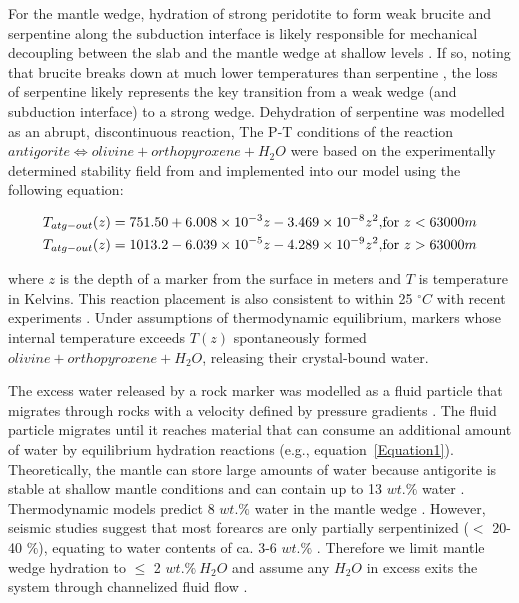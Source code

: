 \documentclass[draft]{agujournal2019}
\begin{document}
For the mantle wedge, hydration of strong peridotite to form weak brucite and serpentine along the subduction interface is likely responsible for mechanical decoupling between the slab and the mantle wedge at shallow levels \cite{Peacock1999a, Hyndman2003}. If so, noting that brucite breaks down at much lower temperatures than serpentine \cite{Schmidt1998}, the loss of serpentine likely represents the key transition from a weak wedge (and subduction interface) to a strong wedge. Dehydration of serpentine was modelled as an abrupt, discontinuous reaction,  The P-T conditions of the reaction $antigorite \Leftrightarrow olivine + orthopyroxene + H_{2}O$ were based on the experimentally determined stability field from  and implemented into our model using the following equation:

\begin{equation}
 \begin{alignedat}{2}
  T_{atg-out}(z) &= 751.50+\num{6.008d-3}z-\num{3.469d-8}z^2, && \text{for $z<63000m$} \\
  T_{atg-out}(z) &= 1013.2-\num{6.039d-5}z-\num{4.289d-9}z^2, && \text{for $z>63000m$}
 \end{alignedat}
 \label{Equation1}
\end{equation}

where $z$ is the depth of a marker from the surface in meters and $T$ is temperature in Kelvins. This reaction placement is also consistent to within 25 $^{\circ}C$ with recent experiments \cite{Shen2015}. Under assumptions of thermodynamic equilibrium, markers whose internal temperature exceeds $T(z)$  spontaneously formed $olivine \allowbreak+ orthopyroxene \allowbreak+ H_2O$, releasing their crystal-bound water. 

The excess water released by a rock marker was modelled as a fluid particle that migrates through rocks with a velocity defined by pressure gradients  \cite[see Appendix A]{Faccenda2009}. The fluid particle migrates until it reaches material that can consume an additional amount of water by equilibrium  hydration reactions (e.g., equation~\ref{Equation1}). Theoretically, the mantle can store large amounts of water because antigorite is stable at shallow mantle conditions and can contain up to 13 $wt.\%$ water \cite{Reynard2013}. Thermodynamic models predict 8 $wt.\%$ water in the mantle wedge \cite{Connolly2005}. However, seismic studies suggest that most forearcs are only partially serpentinized ($<$ 20-40 $\%$), equating to water contents of ca. 3-6 $wt.\%$ \cite{Abers2017, Carlson2003}. Therefore we limit mantle wedge hydration to $\leq$ 2 $wt.\% ~H_2O$ and assume any $H_2O$ in excess exits the system through channelized fluid flow \cite{Davies1999}.
\end{document}
